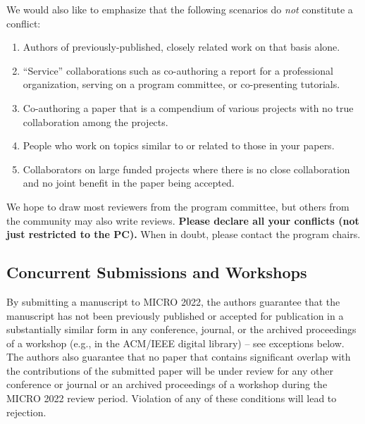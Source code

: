 \documentclass{sig-alternate}
\begin{document}
{We would also like to emphasize that the following scenarios do {\em not} constitute a conflict:
\begin{enumerate}
\item Authors of previously-published, closely related work on that basis alone.
\item ``Service'' collaborations such as co-authoring a report for a professional organization, serving on a program committee, or co-presenting tutorials.
\item Co-authoring a paper that is a compendium of various projects with no true collaboration among the projects.
\item People who work on topics similar to or related to those in your papers.
\item Collaborators on large funded projects where there is no close collaboration and no joint benefit in the paper being accepted.
\end{enumerate}

We hope to draw most reviewers from the program committee, but others
from the community may also write reviews. {\bf Please declare all your conflicts (not just restricted to the PC).} When in doubt, please contact the program chairs.



\subsection{Concurrent Submissions and Workshops}

By submitting a manuscript to MICRO 2022, the authors guarantee that the manuscript has not been previously published or accepted for publication in a substantially similar form in any conference, journal, or the archived proceedings of a workshop (e.g., in the ACM/IEEE digital library) -- see exceptions below. The authors also guarantee that no paper that contains significant overlap with the contributions of the submitted paper will be under review for any other conference or journal or an archived proceedings of a workshop during the MICRO 2022 review period. Violation of any of these conditions will lead to rejection.

}
\end{document}
